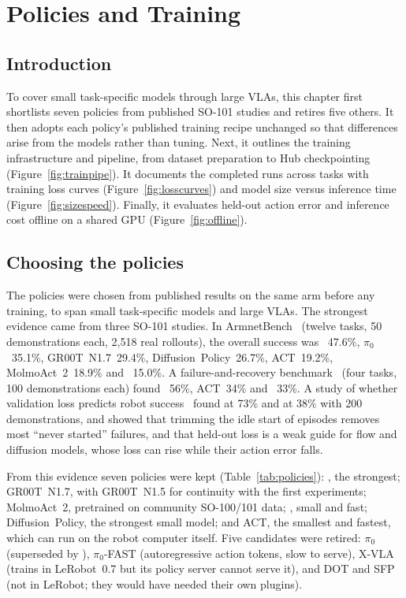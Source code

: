 \chapter{Policies and Training}\label{ch:policies}

\section{Introduction}
To cover small task-specific models through large VLAs, this chapter first shortlists seven policies from published SO-101 studies and retires five others. It then adopts each policy's published training recipe unchanged so that differences arise from the models rather than tuning. Next, it outlines the training infrastructure and pipeline, from dataset preparation to Hub checkpointing (Figure~\ref{fig:trainpipe}). It documents the completed runs across tasks with training loss curves (Figure~\ref{fig:losscurves}) and model size versus inference time (Figure~\ref{fig:sizespeed}). Finally, it evaluates held-out action error and inference cost offline on a shared GPU (Figure~\ref{fig:offline}).

\section{Choosing the policies}\label{sec:shortlist}

The policies were chosen from published results on the same arm before any training, to span small task-specific
models and large VLAs. The strongest evidence came from three SO-101 studies. In ArmnetBench~\cite{armnetbench}
(twelve tasks, 50 demonstrations each, 2{,}518 real rollouts), the overall success was \pizerofive{}~47.6\%,
$\pi_0$~35.1\%, GR00T~N1.7~29.4\%, Diffusion~Policy~26.7\%, ACT~19.2\%, MolmoAct~2~18.9\% and \smolvla{}~15.0\%. A
failure-and-recovery benchmark~\cite{so101failure} (four tasks, 100 demonstrations each) found \pizerofive{}~56\%,
ACT~34\% and \smolvla{}~33\%. A study of whether validation loss predicts robot success~\cite{valloss2026} found
\pizerofive{} at 73\% and \smolvla{} at 38\% with 200 demonstrations, and showed that trimming the idle start of episodes
removes most \enquote{never started} failures, and that held-out loss is a weak guide for flow and diffusion models,
whose loss can rise while their action error falls.

From this evidence seven policies were kept (Table~\ref{tab:policies}): \pizerofive, the strongest; GR00T~N1.7, with
GR00T~N1.5 for continuity with the first experiments; MolmoAct~2, pretrained on community SO-100/101 data; \smolvla,
small and fast; Diffusion~Policy, the strongest small model; and ACT, the smallest and fastest, which can run on the
robot computer itself. Five candidates were retired: $\pi_0$ (superseded by \pizerofive), $\pi_0$-FAST
(autoregressive action tokens, slow to serve), X-VLA (trains in LeRobot~0.7 but its policy server cannot serve it),
and DOT and SFP (not in LeRobot; they would have needed their own plugins).

